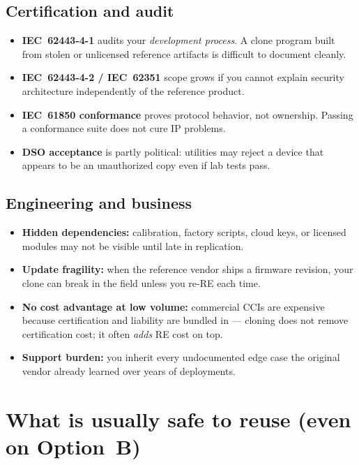 \documentclass[11pt,a4paper]{article}
\begin{document}
\subsection{Certification and audit}

\begin{itemize}[leftmargin=*]
  \item \textbf{IEC~62443-4-1} audits your \emph{development process}. A clone program built from stolen or unlicensed reference
        artifacts is difficult to document cleanly.
  \item \textbf{IEC~62443-4-2 / IEC~62351} scope grows if you cannot explain security architecture independently of the reference product.
  \item \textbf{IEC~61850 conformance} proves protocol behavior, not ownership. Passing a conformance suite does not cure IP problems.
  \item \textbf{DSO acceptance} is partly political: utilities may reject a device that appears to be an unauthorized copy even if lab tests pass.
\end{itemize}

\subsection{Engineering and business}

\begin{itemize}[leftmargin=*]
  \item \textbf{Hidden dependencies:} calibration, factory scripts, cloud keys, or licensed modules may not be visible until late in replication.
  \item \textbf{Update fragility:} when the reference vendor ships a firmware revision, your clone can break in the field unless you re-RE each time.
  \item \textbf{No cost advantage at low volume:} commercial CCIs are expensive because certification and liability are bundled in --- cloning does not
        remove certification cost; it often \emph{adds} RE cost on top.
  \item \textbf{Support burden:} you inherit every undocumented edge case the original vendor already learned over years of deployments.
\end{itemize}

\section{What is usually safe to reuse (even on Option~B)}
\end{document}
